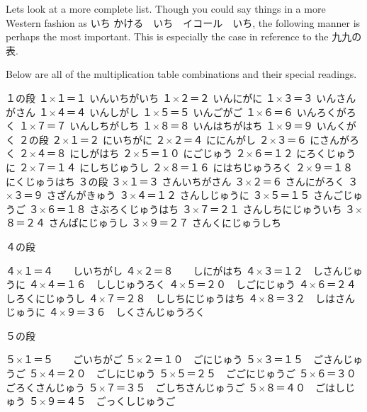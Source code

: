 \par{ Let\textquotesingle s look at a more complete list. Though you could say things in a more Western fashion as いち かける　いち　イコール　いち, the following manner is perhaps the most important. This is especially the case in reference to the 九九の表. }

\par{Below are all of the multiplication table combinations and their special readings. }

\par{１の段 \hfill\break
１×１＝１ いんいちがいち \hfill\break
１×２＝２ いんにがに \hfill\break
１×３＝３ いんさんがさん \hfill\break
１×４＝４ いんしがし \hfill\break
１×５＝５ いんごがご \hfill\break
１×６＝６ いんろくがろく \hfill\break
１×７＝７ いんしちがしち \hfill\break
１×８＝８ いんはちがはち \hfill\break
１×９＝９ いんくがく \hfill\break
 \hfill\break
２の段 \hfill\break
２×１＝２ にいちがに \hfill\break
２×２＝４ ににんがし \hfill\break
２×３＝６ にさんがろく \hfill\break
２×４＝８ にしがはち \hfill\break
２×５＝１０ にごじゅう \hfill\break
２×６＝１２ にろくじゅうに \hfill\break
２×７＝１４ にしちじゅうし \hfill\break
２×８＝１６ にはちじゅうろく \hfill\break
２×９＝１８ にくじゅうはち \hfill\break
 \hfill\break
３の段 \hfill\break
３×１＝３ さんいちがさん \hfill\break
３×２＝６ さんにがろく \hfill\break
３×３＝９ さざんがきゅう \hfill\break
３×４＝１２ さんしじゅうに \hfill\break
３×５＝１５ さんごじゅうご \hfill\break
３×６＝１８ さぶろくじゅうはち \hfill\break
３×７＝２１ さんしちにじゅういち \hfill\break
３×８＝２４ さんぱにじゅうし \hfill\break
３×９＝２７ さんくにじゅうしち }

\par{４の段 }

\par{４×１＝４　　しいちがし \hfill\break
４×２＝８　　しにがはち \hfill\break
４×３＝１２　しさんじゅうに \hfill\break
４×４＝１６　ししじゅうろく \hfill\break
４×５＝２０　しごにじゅう \hfill\break
４×６＝２４　しろくにじゅうし \hfill\break
４×７＝２８　ししちにじゅうはち \hfill\break
４×８＝３２　しはさんじゅうに \hfill\break
４×９＝３６　しくさんじゅうろく }

\par{５の段 }

\par{５×１＝５　　ごいちがご \hfill\break
５×２＝１０　ごにじゅう \hfill\break
５×３＝１５　ごさんじゅうご \hfill\break
５×４＝２０　ごしにじゅう \hfill\break
５×５＝２５　ごごにじゅうご \hfill\break
５×６＝３０　ごろくさんじゅう \hfill\break
５×７＝３５　ごしちさんじゅうご \hfill\break
５×８＝４０　ごはしじゅう \hfill\break
５×９＝４５　ごっくしじゅうご }

